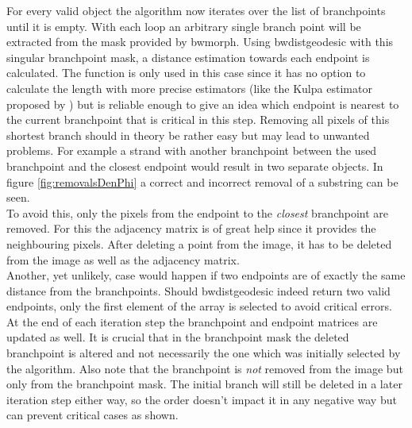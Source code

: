 \documentclass{article}
\begin{document}
For every valid object the algorithm now iterates over the list of branchpoints until it is empty. With each loop an arbitrary single branch point will be extracted from the mask provided by bwmorph. Using bwdistgeodesic with this singular branchpoint mask, a distance estimation towards each endpoint is calculated. The function is only used in this case since it has no option to calculate the length with more precise estimators (like the Kulpa estimator proposed by \cite{rivetti2001accurate}) but is reliable enough to give an idea which endpoint is nearest to the current branchpoint that is critical in this step. Removing all pixels of this shortest branch should in theory be rather easy but may lead to unwanted problems. For example a strand with another branchpoint between the used branchpoint and the closest endpoint would result in two separate objects. In figure \ref{fig:removalsDenPhi} a correct and incorrect removal of a substring can be seen.\\
To avoid this, only the pixels from the endpoint to the \textit{closest} branchpoint are removed. For this the adjacency matrix is of great help since it provides the neighbouring pixels. After deleting a point from the image, it has to be deleted from the image as well as the adjacency matrix. \\
Another, yet unlikely, case would happen if two endpoints are of exactly the same distance from the branchpoints. Should bwdistgeodesic indeed return two valid endpoints, only the first element of the array is selected to avoid critical errors. \\
At the end of each iteration step the branchpoint and endpoint matrices are updated as well. It is crucial that in the branchpoint mask the deleted branchpoint is altered and not necessarily the one which was initially selected by the algorithm. Also note that the branchpoint is \textit{not} removed from the image but only from the branchpoint mask.
The initial branch will still be deleted in a later iteration step either way, so the order doesn't impact it in any negative way but can prevent critical cases as shown. \\
\end{document}
